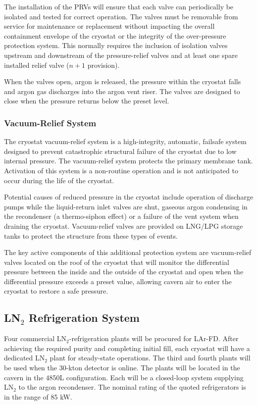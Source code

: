 The installation of the PRVs will ensure that each valve can periodically be isolated and tested for correct operation.  The valves must be removable from service for maintenance 
or replacement without impacting the overall containment envelope of the cryostat or the integrity of the 
over-pressure protection system.  This normally requires the inclusion of isolation valves upstream and downstream of the pressure-relief valves and at least one spare installed relief valve ($n+1$ provision).

When the valves open, argon is released, the pressure within the cryostat falls and argon gas discharges into the argon vent riser.  The valves are designed to close when the pressure returns below the preset level.

\subsubsection{Vacuum-Relief System}

The cryostat vacuum-relief system is a high-integrity, automatic, failsafe system designed to prevent catastrophic structural failure of the cryostat due to low internal pressure.  The vacuum-relief system protects the primary membrane tank. Activation of this system is a non-routine operation and is not anticipated to occur during the life of the cryostat. 

Potential causes of reduced pressure in the cryostat include operation of discharge pumps while the liquid-return inlet valves are shut, gaseous argon condensing in the recondenser (a thermo-siphon effect) or a failure of the vent system when draining the cryostat.  Vacuum-relief valves are provided on LNG/LPG storage tanks to protect the structure from these types of events.  


The key active components of this additional protection system are vacuum-relief valves located on the roof of the cryostat that will monitor the differential pressure between the inside and the outside of the cryostat and open when the differential pressure exceeds a preset value, allowing cavern air to enter the cryostat to restore a safe pressure. 

\subsection{LN$_2$ Refrigeration System}
\label{sec:ln-refrig-sys}
Four commercial LN$_2$-refrigeration plants will be procured for LAr-FD.  After achieving the
required purity and completing initial fill, each cryostat will
have a dedicated LN$_2$ plant for steady-state operations.
The third and fourth plants will be used when the 30-kton detector is online. The plants will be located in the cavern in the 4850L configuration. Each will be a
closed-loop system supplying LN$_2$
to the argon recondenser. The nominal rating of the quoted
refrigerators is in the range of 85 kW.

